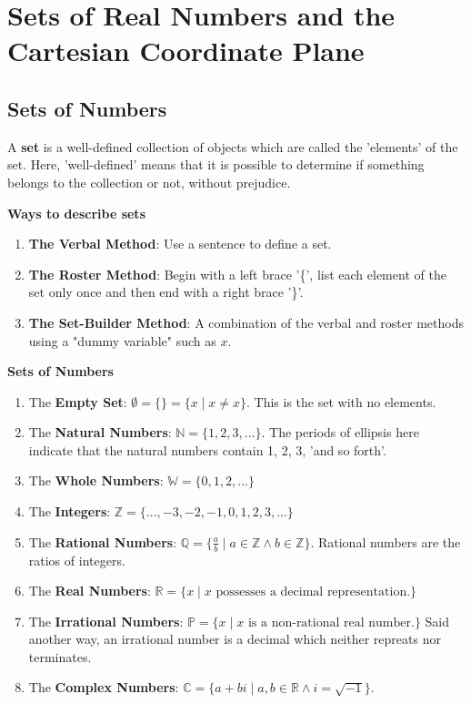 \section{Sets of Real Numbers and the Cartesian Coordinate Plane}

\subsection{Sets of Numbers}
\begin{definition}[Set]
    A \textbf{set} is a well-defined collection of objects which are called the 'elements' of the set. Here, 'well-defined' means that it is possible to determine if something belongs to the collection or not, without prejudice.
\end{definition}

\begin{definition}
    \textbf{Ways to describe sets}
    \begin{enumerate}
        \item \textbf{The Verbal Method}: Use a sentence to define a set.
        \item \textbf{The Roster Method}: Begin with a left brace '\{', list each element of the set only once and then end with a right brace '\}'.
        \item \textbf{The Set-Builder Method}: A combination of the verbal and roster methods using a "dummy variable" such as $x$.
    \end{enumerate}
\end{definition}

\begin{definition}
    \textbf{Sets of Numbers}
    \begin{enumerate}
        \item The \textbf{Empty Set}: $\emptyset = \{\} = \{x \mid x \neq x\}$. This is the set with no elements.
        \item The \textbf{Natural Numbers}: $\mathbb{N} = \{1,2,3,...\}$. The periods of ellipsis here indicate that the natural numbers contain 1, 2, 3, 'and so forth'.
        \item The \textbf{Whole Numbers}: $\mathbb{W} = \{0,1,2,...\}$
        \item The \textbf{Integers}: $\mathbb{Z} = \{...,-3,-2,-1,0,1,2,3,...\}$
        \item The \textbf{Rational Numbers}: $\mathbb{Q} = \{\frac{a}{b} \mid a \in \mathbb{Z} \land b \in \mathbb{Z}\}$. Rational numbers are the ratios of integers.
        \item The \textbf{Real Numbers}: $\mathbb{R} = \{x \mid x \text{ possesses a decimal representation.}\}$
        \item The \textbf{Irrational Numbers}: $\mathbb{P} = \{x \mid x \text{ is a non-rational real number.}\}$ Said another way, an irrational number is a decimal which neither repreats nor terminates.
        \item The \textbf{Complex Numbers}: $\mathbb{C} = \{a+bi \mid a, b \in \mathbb{R} \land i=\sqrt{-1}\}$.
    \end{enumerate}
\end{definition}

